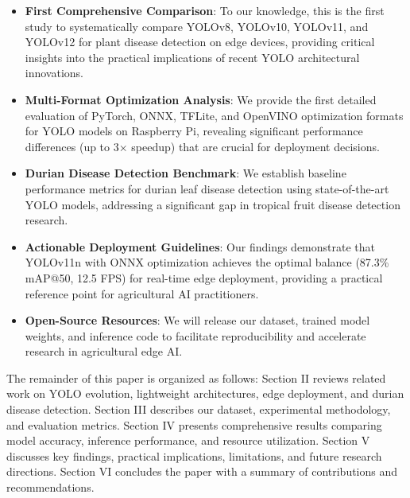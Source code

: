 \begin{itemize}
\item \textbf{First Comprehensive Comparison}: To our knowledge, this is the first study to systematically compare YOLOv8, YOLOv10, YOLOv11, and YOLOv12 for plant disease detection on edge devices, providing critical insights into the practical implications of recent YOLO architectural innovations.

\item \textbf{Multi-Format Optimization Analysis}: We provide the first detailed evaluation of PyTorch, ONNX, TFLite, and OpenVINO optimization formats for YOLO models on Raspberry Pi, revealing significant performance differences (up to 3$\times$ speedup) that are crucial for deployment decisions.

\item \textbf{Durian Disease Detection Benchmark}: We establish baseline performance metrics for durian leaf disease detection using state-of-the-art YOLO models, addressing a significant gap in tropical fruit disease detection research.

\item \textbf{Actionable Deployment Guidelines}: Our findings demonstrate that YOLOv11n with ONNX optimization achieves the optimal balance (87.3\% mAP@50, 12.5 FPS) for real-time edge deployment, providing a practical reference point for agricultural AI practitioners.

\item \textbf{Open-Source Resources}: We will release our dataset, trained model weights, and inference code to facilitate reproducibility and accelerate research in agricultural edge AI.
\end{itemize}

The remainder of this paper is organized as follows: Section II reviews related work on YOLO evolution, lightweight architectures, edge deployment, and durian disease detection. Section III describes our dataset, experimental methodology, and evaluation metrics. Section IV presents comprehensive results comparing model accuracy, inference performance, and resource utilization. Section V discusses key findings, practical implications, limitations, and future research directions. Section VI concludes the paper with a summary of contributions and recommendations.
